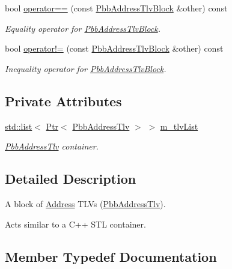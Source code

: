 \begin{DoxyCompactItemize}
bool \hyperlink{classns3_1_1PbbAddressTlvBlock_a80a2d8a2b596e789749e4a204a306b55}{operator==} (const \hyperlink{classns3_1_1PbbAddressTlvBlock}{Pbb\+Address\+Tlv\+Block} \&other) const 
\begin{DoxyCompactList}\small\item\em Equality operator for \hyperlink{classns3_1_1PbbAddressTlvBlock}{Pbb\+Address\+Tlv\+Block}. \end{DoxyCompactList}\item 
bool \hyperlink{classns3_1_1PbbAddressTlvBlock_a79ec3bb970cec68ea3f424b004cce421}{operator!=} (const \hyperlink{classns3_1_1PbbAddressTlvBlock}{Pbb\+Address\+Tlv\+Block} \&other) const 
\begin{DoxyCompactList}\small\item\em Inequality operator for \hyperlink{classns3_1_1PbbAddressTlvBlock}{Pbb\+Address\+Tlv\+Block}. \end{DoxyCompactList}\end{DoxyCompactItemize}
\subsection*{Private Attributes}
\begin{DoxyCompactItemize}
\item 
\hyperlink{openflow-interface_8h_afd9bcfa176617760671b67580f536fa7}{std\+::list}$<$ \hyperlink{classns3_1_1Ptr}{Ptr}$<$ \hyperlink{classns3_1_1PbbAddressTlv}{Pbb\+Address\+Tlv} $>$ $>$ \hyperlink{classns3_1_1PbbAddressTlvBlock_a5b980e7869d03f502370180d866ba1ef}{m\+\_\+tlv\+List}
\begin{DoxyCompactList}\small\item\em \hyperlink{classns3_1_1PbbAddressTlv}{Pbb\+Address\+Tlv} container. \end{DoxyCompactList}\end{DoxyCompactItemize}


\subsection{Detailed Description}
A block of \hyperlink{classns3_1_1Address}{Address} T\+L\+Vs (\hyperlink{classns3_1_1PbbAddressTlv}{Pbb\+Address\+Tlv}). 

Acts similar to a C++ S\+TL container. 

\subsection{Member Typedef Documentation}
